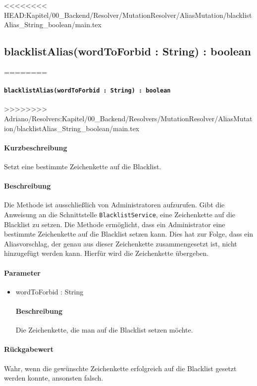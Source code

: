 <<<<<<<< HEAD:Kapitel/00_Backend/Resolver/MutationResolver/AliasMutation/blacklistAlias_String_boolean/main.tex
\subsection{blacklistAlias(wordToForbid : String) : boolean}%
========
\paragraph{\texttt{blacklistAlias(wordToForbid : String) : boolean}}%
>>>>>>>> Adriano/Resolvers:Kapitel/00_Backend/Resolvers/MutationResolver/AliasMutation/blacklistAlias_String_boolean/main.tex
\paragraph*{Kurzbeschreibung}
Setzt eine bestimmte Zeichenkette auf die Blacklist.
\paragraph*{Beschreibung}
Die Methode ist ausschließlich von Administratoren aufzurufen.
Gibt die Anweisung an die Schnittstelle \texttt{BlacklistService}, eine Zeichenkette auf die Blacklist zu setzen.
Die Methode ermöglicht, dass ein Administrator eine bestimmte Zeichenkette auf die Blacklist setzen kann.
Dies hat zur Folge, dass ein Aliasvorschlag, der genau aus dieser Zeichenkette zusammengesetzt ist, nicht hinzugefügt werden kann.
Hierfür wird die Zeichenkette übergeben.
\paragraph*{Parameter}
\begin{itemize}
    \item wordToForbid : String
    		\paragraph*{Beschreibung}
    		Die Zeichenkette, die man auf die Blacklist setzen möchte.
\end{itemize}
\paragraph*{Rückgabewert}
Wahr, wenn die gewünschte Zeichenkette erfolgreich auf die Blacklist gesetzt werden konnte, ansonsten falsch.

